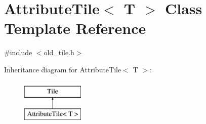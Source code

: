 \hypertarget{classAttributeTile}{}\section{Attribute\+Tile$<$ T $>$ Class Template Reference}
\label{classAttributeTile}


{\ttfamily \#include $<$old\+\_\+tile.\+h$>$}

Inheritance diagram for Attribute\+Tile$<$ T $>$\+:\begin{figure}[H]
\begin{center}
\leavevmode
\includegraphics[height=2.000000cm]{classAttributeTile}
\end{center}
\end{figure}
